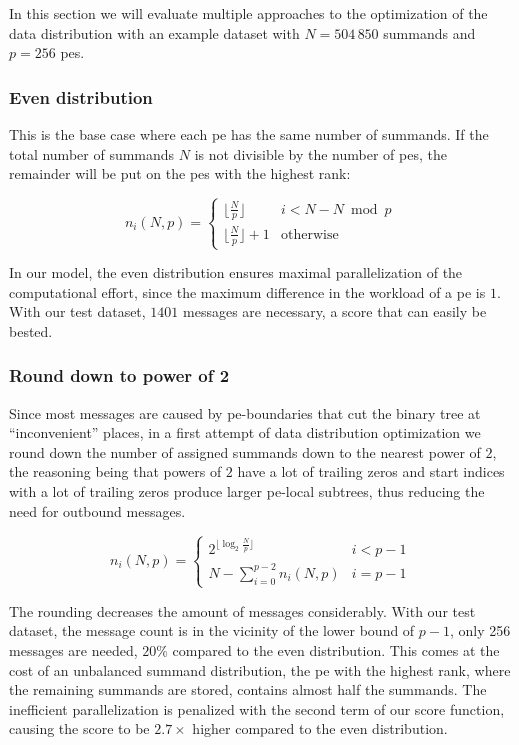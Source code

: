In this section we will evaluate multiple approaches to the optimization of the data distribution with an example dataset with $N = 504\,850$ summands
and $p = 256$ \glspl{pe}.


\subsubsection{Even distribution}
This is the base case where each \gls{pe} has the same number of summands. If the total number of summands $N$ is not divisible by the number of
\glspl{pe}, the remainder will be put on the \glspl{pe} with the highest rank:

\begin{equation}
\label{eq:evenDistribution}
n_i (N, p) = \begin{cases}
\lfloor \tfrac{N}{p} \rfloor & i < N - N \bmod p \\
\lfloor \tfrac{N}{p} \rfloor + 1 & \textrm{otherwise}
\end{cases}
\end{equation}

In our model, the even distribution ensures maximal parallelization of the computational effort, since the maximum difference in the workload of a
\gls{pe} is $1$. With our test dataset, $1401$ messages are necessary, a score that can easily be bested.

\subsubsection{Round down to power of 2}
\label{sec:roundDownPower2Distribution}
Since most messages are caused by \gls{pe}-boundaries that cut the binary tree at \enquote{inconvenient} places, in a first attempt of data distribution
optimization we round down the number of assigned summands down to the nearest power of $2$,
the reasoning being that powers of $2$ have a lot of trailing
zeros and start indices with a lot of trailing zeros produce larger \gls{pe}-local subtrees, thus reducing the need for outbound messages.

\begin{equation}
\label{eq:roundDownPower2Distribution}
n_i (N, p) = \begin{cases}
2^{\lfloor \log_2 \frac{N}{p} \rfloor} & i < p - 1\\
N - \sum_{i=0}^{p-2} n_i (N,p) & i = p - 1
\end{cases}
\end{equation}

The rounding decreases the amount of messages considerably. With our test dataset, the message count is in the vicinity of the lower bound of $p - 1$, only
256 messages are needed, $20\%$ compared to the even distribution. This comes at the cost of an unbalanced summand distribution, the \gls{pe}
with the highest rank, where the remaining summands are stored, contains almost half the summands.
The inefficient parallelization is penalized with the second term of our score function, causing the score to be $2.7\times$ higher compared to
the even distribution.

